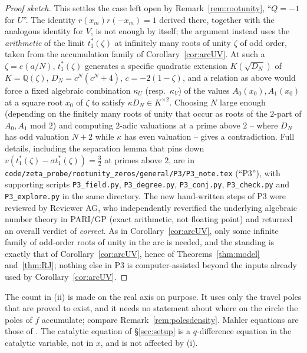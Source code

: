 \documentclass[11pt]{article}
\theoremstyle{plain}
\theoremstyle{definition}
\theoremstyle{remark}
\newcommand{\Q}{\mathbb{Q}}
\theoremstyle{plain}\newtheorem*{maintheorem}{Main Theorem}
\begin{document}
\begin{proof}[Proof sketch]
This settles the case left open by Remark~\ref{rem:rootunity}, ``$Q=-1$ for $U$''. The identity
$r(x_m)r(-x_m)=1$ derived there, together with the analogous identity for $V$, is not enough by
itself; the argument instead uses the \emph{arithmetic} of the limit $t_1^\ast(\zeta)$ at
infinitely many roots of unity $\zeta$ of odd order, taken from the accumulation family of
Corollary~\ref{cor:arcUV}. At such a $\zeta=e(a/N)$, $t_1^\ast(\zeta)$ generates a specific
quadratic extension $K(\sqrt{D_N})$ of $K=\Q(\zeta)$, $D_N=c^N(c^N+4)$, $c=-2(1-\zeta)$, and a
relation as above would force a fixed algebraic combination $\kappa_U$ (resp.\ $\kappa_V$) of the
values $A_0(x_0),A_1(x_0)$ at a square root $x_0$ of $\zeta$ to satisfy $\kappa D_N\in K^{\times2}$.
Choosing $N$ large enough (depending on the finitely many roots of unity that occur as roots of the
$2$-part of $A_0,A_1$ mod $2$) and computing $2$-adic valuations at a prime above $2$ -- where $D_N$
has odd valuation $N+2$ while $\kappa$ has even valuation -- gives a contradiction. Full details,
including the separation lemma that pins down $v(t_1^\ast(\zeta)-\sigma t_1^\ast(\zeta))=\frac32$ at
primes above $2$, are in \texttt{code/zeta\_probe/rootunity\_zeros/general/P3/P3\_note.tex}
(``P3''), with supporting scripts \texttt{P3\_field.py}, \texttt{P3\_degree.py},
\texttt{P3\_conj.py}, \texttt{P3\_check.py} and \texttt{P3\_explore.py} in the same directory. The
new hand-written steps of P3 were reviewed by Reviewer AG, who independently reverified the
underlying algebraic number theory in PARI/GP (exact arithmetic, not floating point) and returned
an overall verdict of \emph{correct}. As in Corollary~\ref{cor:arcUV}, only some infinite family of
odd-order roots of unity in the arc is needed, and the standing is exactly that of
Corollary~\ref{cor:arcUV}, hence of Theorems~\ref{thm:model} and~\ref{thm:RJ}; nothing else in
P3 is computer-assisted beyond the inputs already used by Corollary~\ref{cor:arcUV}.
\end{proof}

\noindent The count in (ii) is made on the real axis on purpose. It uses only the travel poles that
are proved to exist, and it needs no statement about where on the circle the poles of $f$
accumulate; compare Remark~\ref{rem:polesdensity}. Mahler equations are those of
\cite{Nishioka1996}. The catalytic equation of \S\ref{sec:setup} is a $q$-difference equation in
the catalytic variable, not in $x$, and is not affected by (i).
\end{document}

